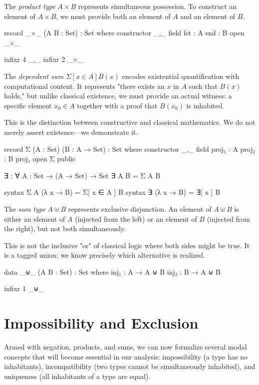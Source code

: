 \documentclass[11pt,a4paper]{book}
\begin{document}
The \emph{product type} $A \times B$ represents simultaneous possession. To construct 
an element of $A \times B$, we must provide both an element of $A$ and an element of $B$.

\begin{code}
record _×_ (A B : Set) : Set where
  constructor _,_
  field
    fst : A
    snd : B
open _×_

infixr 4 _,_
infixr 2 _×_
\end{code}

The \emph{dependent sum} $\Sigma[ x \in A ] B(x)$ encodes existential quantification 
with computational content. It represents "there exists an $x$ in $A$ such that $B(x)$ holds," 
but unlike classical existence, we must provide an actual witness: a specific element $x_0 \in A$ 
together with a proof that $B(x_0)$ is inhabited.

This is the distinction between constructive and classical mathematics. We do not merely 
assert existence—we demonstrate it.

\begin{code}
record Σ (A : Set) (B : A → Set) : Set where
  constructor _,_
  field
    proj₁ : A
    proj₂ : B proj₁
open Σ public

∃ : ∀ {A : Set} → (A → Set) → Set
∃ {A} B = Σ A B

syntax Σ A (λ x → B) = Σ[ x ∈ A ] B
syntax ∃ (λ x → B) = ∃[ x ] B
\end{code}

The \emph{sum type} $A \uplus B$ represents exclusive disjunction. An element of 
$A \uplus B$ is either an element of $A$ (injected from the left) or an element of $B$ 
(injected from the right), but not both simultaneously.

This is not the inclusive "or" of classical logic where both sides might be true. 
It is a tagged union: we know precisely which alternative is realized.

\begin{code}
data _⊎_ (A B : Set) : Set where
  inj₁ : A → A ⊎ B
  inj₂ : B → A ⊎ B

infixr 1 _⊎_
\end{code}

\section{Impossibility and Exclusion}

Armed with negation, products, and sums, we can now formalize several modal concepts 
that will become essential in our analysis: impossibility (a type has no inhabitants), 
incompatibility (two types cannot be simultaneously inhabited), and uniqueness (all 
inhabitants of a type are equal).
\end{document}
